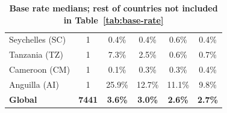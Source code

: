 {\begin{table}[ht]
{\begin{tabular}{lccccc}
Seychelles (SC)       &     1  & \cellcolor{green1} 0.4\% & \cellcolor{green1} 0.4\% & \cellcolor{red5}  0.6\% & \cellcolor{green1} 0.4\% \\  %
Tanzania (TZ)         &     1  & \cellcolor{red5}  7.3\% & 2.5\% & \cellcolor{green2} 0.6\% & \cellcolor{green2} 0.7\% \\  %
Cameroon (CM)         &     1  & \cellcolor{green5}  0.1\% & 0.3\% & 0.3\% & \cellcolor{red5}  0.4\% \\  %
Anguilla (AI)         &     1  & \cellcolor{red5}  25.9\% & \cellcolor{green0} 12.7\% & \cellcolor{green1} 11.1\% & \cellcolor{green2} 9.8\% \\  %
\hline
\textbf{Global}            & \textbf{ 7441} & \textbf{3.6\%} & \textbf{3.0\%} & \textbf{2.6\%} & \textbf{2.7\%} \\ %
                \bottomrule
        \end{tabular}
        }
        \caption{\textbf{Base rate medians; rest of countries not included in Table~\ref{tab:base-rate}}}
    \end{table}
}
 



